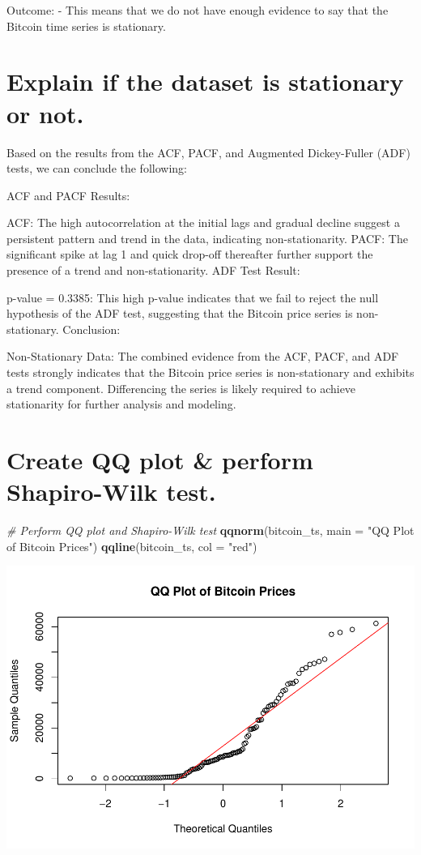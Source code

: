 \documentclass[
]{book}
\newenvironment{Shaded}{\begin{snugshade}}{\end{snugshade}}
\newcommand{\AttributeTok}[1]{\textcolor[rgb]{0.13,0.29,0.53}{#1}}
\newcommand{\CommentTok}[1]{\textcolor[rgb]{0.56,0.35,0.01}{\textit{#1}}}
\newcommand{\FunctionTok}[1]{\textcolor[rgb]{0.13,0.29,0.53}{\textbf{#1}}}
\newcommand{\NormalTok}[1]{#1}
\newcommand{\StringTok}[1]{\textcolor[rgb]{0.31,0.60,0.02}{#1}}
\begin{document}
Outcome:
- This means that we do not have enough evidence to say that the Bitcoin time series is stationary.

\section{Explain if the dataset is stationary or not.}\label{explain-if-the-dataset-is-stationary-or-not.}

Based on the results from the ACF, PACF, and Augmented Dickey-Fuller (ADF) tests, we can conclude the following:

ACF and PACF Results:

ACF: The high autocorrelation at the initial lags and gradual decline suggest a persistent pattern and trend in the data, indicating non-stationarity.
PACF: The significant spike at lag 1 and quick drop-off thereafter further support the presence of a trend and non-stationarity.
ADF Test Result:

p-value = 0.3385: This high p-value indicates that we fail to reject the null hypothesis of the ADF test, suggesting that the Bitcoin price series is non-stationary.
Conclusion:

Non-Stationary Data: The combined evidence from the ACF, PACF, and ADF tests strongly indicates that the Bitcoin price series is non-stationary and exhibits a trend component. Differencing the series is likely required to achieve stationarity for further analysis and modeling.

\section{Create QQ plot \& perform Shapiro-Wilk test.}\label{create-qq-plot-perform-shapiro-wilk-test.}

\begin{Shaded}
\begin{Highlighting}[]
\CommentTok{\# Perform QQ plot and Shapiro{-}Wilk test}
\FunctionTok{qqnorm}\NormalTok{(bitcoin\_ts, }\AttributeTok{main =} \StringTok{"QQ Plot of Bitcoin Prices"}\NormalTok{)}
\FunctionTok{qqline}\NormalTok{(bitcoin\_ts, }\AttributeTok{col =} \StringTok{"red"}\NormalTok{)}
\end{Highlighting}
\end{Shaded}

\includegraphics{bookdown-demo_files/figure-latex/unnamed-chunk-36-1.pdf}
\end{document}
